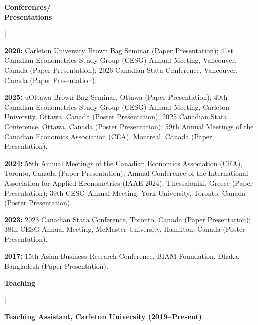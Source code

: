 \documentclass[11pt]{article}
\newcommand{\cvlabel}[1]{%
    \raisebox{0pt}[0pt][0pt]{%
        \parbox[t]{1.38in}{%
            \raggedright
            \bfseries
            #1
        }%
    }%
}
\begin{document}
\begin{cvsections}
\begin{cvitems}
\end{cvitems}


\item[\cvlabel{Conferences/\\Presentations}]

\begin{cvitems}

\item
\textbf{2026:}
Carleton University Brown Bag Seminar
(Paper Presentation);
41st Canadian Econometrics Study Group (CESG) Annual Meeting,
Vancouver, Canada
(Paper Presentation);
2026 Canadian Stata Conference,
Vancouver, Canada
(Paper Presentation).


\item
\textbf{2025:}
uOttawa Brown Bag Seminar,
Ottawa
(Paper Presentation);
40th Canadian Econometrics Study Group (CESG) Annual Meeting,
Carleton University,
Ottawa, Canada
(Poster Presentation);
2025 Canadian Stata Conference,
Ottawa, Canada
(Poster Presentation);
59th Annual Meetings of the Canadian Economics Association (CEA),
Montreal, Canada
(Paper Presentation).


\item
\textbf{2024:}
58th Annual Meetings of the Canadian Economics Association (CEA),
Toronto, Canada
(Paper Presentation);
Annual Conference of the International Association for Applied Econometrics
(IAAE 2024),
Thessaloniki, Greece
(Paper Presentation);
39th CESG Annual Meeting,
York University,
Toronto, Canada
(Poster Presentation).


\item
\textbf{2023:}
2023 Canadian Stata Conference,
Toronto, Canada
(Paper Presentation);
38th CESG Annual Meeting,
McMaster University,
Hamilton, Canada
(Poster Presentation).


\item
\textbf{2017:}
15th Asian Business Research Conference,
BIAM Foundation,
Dhaka, Bangladesh
(Paper Presentation).

\end{cvitems}


\item[\cvlabel{Teaching}]

\textbf{
Teaching Assistant, Carleton University (2019--Present)
}


\end{cvsections}
\end{document}
